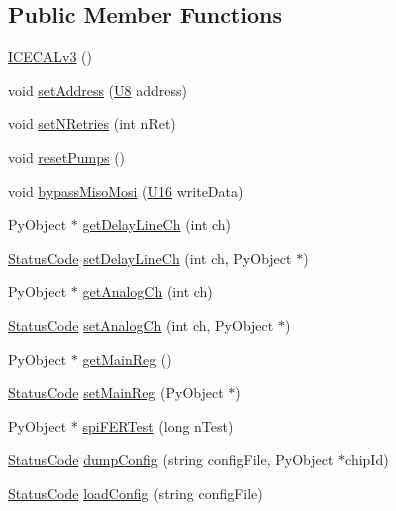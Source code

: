 \subsection*{Public Member Functions}
\begin{DoxyCompactItemize}
\item 
\hyperlink{classICECALv3_a0a8b12d2b6bafca9cd820301fc93dff8}{I\+C\+E\+C\+A\+Lv3} ()
\item 
void \hyperlink{classICECALv3_aaf38119f47401a85022ae1b0d05675bd}{set\+Address} (\hyperlink{ICECALv3_8h_a3cb25ca6f51f003950f9625ff05536fc}{U8} address)
\item 
void \hyperlink{classICECALv3_aae0b7539c0bba5311aab99e000d1be6d}{set\+N\+Retries} (int n\+Ret)
\item 
void \hyperlink{classICECALv3_a1b9ca0e09d45634a70da6f19a7257314}{reset\+Pumps} ()
\item 
void \hyperlink{classICECALv3_a5ce36881aa89fedf7c37e03620acca6e}{bypass\+Miso\+Mosi} (\hyperlink{ICECALv3_8h_adf928e51a60dba0df29d615401cc55a8}{U16} write\+Data)
\item 
Py\+Object $\ast$ \hyperlink{classICECALv3_a7a1c1706a455903f42bb9a5257d94a78}{get\+Delay\+Line\+Ch} (int ch)
\item 
\hyperlink{classStatusCode}{Status\+Code} \hyperlink{classICECALv3_a14a7a29c9a3412c062f053cc616b860a}{set\+Delay\+Line\+Ch} (int ch, Py\+Object $\ast$)
\item 
Py\+Object $\ast$ \hyperlink{classICECALv3_a5f1414e6049a82eafdd505a88d7d0c91}{get\+Analog\+Ch} (int ch)
\item 
\hyperlink{classStatusCode}{Status\+Code} \hyperlink{classICECALv3_a9578e4d13c250d8bc417f68c79d6a21d}{set\+Analog\+Ch} (int ch, Py\+Object $\ast$)
\item 
Py\+Object $\ast$ \hyperlink{classICECALv3_a4a414d23c1e199b446dc876161338148}{get\+Main\+Reg} ()
\item 
\hyperlink{classStatusCode}{Status\+Code} \hyperlink{classICECALv3_a479f7e17669da4b785af840049d39cb4}{set\+Main\+Reg} (Py\+Object $\ast$)
\item 
Py\+Object $\ast$ \hyperlink{classICECALv3_a8639cf6a44cba85b53128b5e1dc21e15}{spi\+F\+E\+R\+Test} (long n\+Test)
\item 
\hyperlink{classStatusCode}{Status\+Code} \hyperlink{classICECALv3_ac26be912fb72e615106fceb4626aa548}{dump\+Config} (string config\+File, Py\+Object $\ast$chip\+Id)
\item 
\hyperlink{classStatusCode}{Status\+Code} \hyperlink{classICECALv3_ae0a77dccd270626bbd600630681b1442}{load\+Config} (string config\+File)

\end{DoxyCompactItemize}
